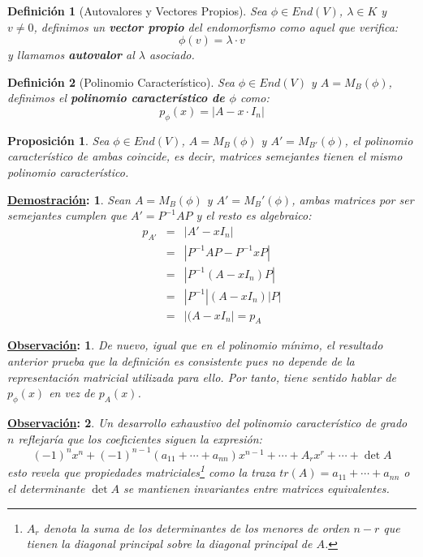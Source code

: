 \documentclass[10pt,a4paper,openright]{book}
\theoremstyle{break}
\newtheorem*{defi}{Definición}
\newtheorem*{prop}{Proposición}
\newtheorem*{demo}{\underline{Demostración}:}
\newtheorem*{obs}{\underline{Observación}:}
\begin{document}
\begin{defi}[Autovalores y Vectores Propios]
Sea $\phi\in End(V)$, $\lambda\in K$ y $v\neq 0$, definimos un \textbf{vector propio} del endomorfismo como aquel que verifica:
$$
\phi(v) = \lambda \cdot v
$$
y llamamos \textbf{autovalor} al $\lambda$ asociado.
\end{defi}

\begin{defi}[Polinomio Característico]
Sea $\phi\in End(V)$ y $A = M_B(\phi)$, definimos el \textbf{polinomio característico de $\phi$} como:
$$p_\phi(x) = |A- x\cdot I_n|$$
\end{defi}

\begin{prop}
Sea $\phi\in End(V)$, $A=M_B(\phi)$ y $A'=M_{B'}(\phi)$, el polinomio característico de ambas coincide, es decir, matrices semejantes tienen el mismo polinomio característico.
\end{prop}
\begin{demo}
Sean $A=M_B(\phi)$ y $A'=M_B'(\phi)$, ambas matrices por ser semejantes cumplen que $A'=P^{-1}AP$ y el resto es algebraico:
\begin{eqnarray*}
p_{A'}
&=& |A'-xI_n| \\
&=& |P^{-1}AP-P^{-1}xP|\\
&=& |P^{-1}(A-xI_n)P|\\
&=& |P^{-1}|(A-xI_n)|P|\\
&=& |(A-xI_n| = p_A
\end{eqnarray*}
\end{demo}

\begin{obs}
De nuevo, igual que en el polinomio mínimo, el resultado anterior prueba que la definición es consistente pues no depende de la representación matricial utilizada para ello. Por tanto, tiene sentido hablar de $p_\phi(x)$ en vez de $p_A(x)$.
\end{obs}

\begin{obs}
Un desarrollo exhaustivo del polinomio característico de grado $n$ reflejaría que los coeficientes siguen la expresión:
$$
(-1)^nx^n + (-1)^{n-1}(a_{11} + \cdots + a_{nn})x^{n-1} + \cdots + A_r x^r + \cdots + \det
A
$$
esto revela que propiedades matriciales\footnote{$A_r$ denota la suma de los determinantes de los menores de orden $n-r$ que tienen la diagonal principal sobre la diagonal principal de $A$.} como la traza $tr(A) = a_{11} + \cdots + a_{nn}$ o el determinante $\det A$ se mantienen invariantes entre matrices equivalentes.
\end{obs}
\end{document}
